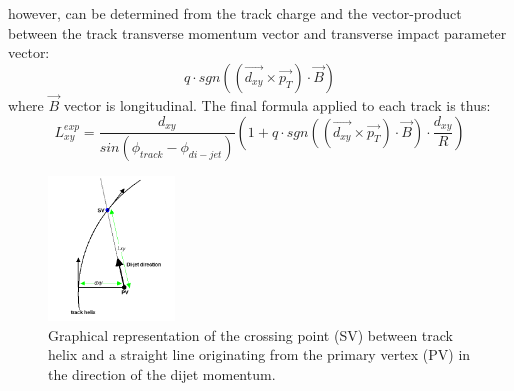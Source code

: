 \begin{enumerate}
however,  can be
determined from the track charge and the vector-product between the track transverse momentum vector and transverse
impact parameter vector:
\begin{equation}
q\cdot sgn((\vec{d_{xy}}\times\vec{p_T}) \cdot \vec{B})
\end{equation}   
where $\vec{B}$ vector is longitudinal. The final formula applied to each track is thus:
\begin{equation}
 L_{xy}^{exp} = \frac{d_{xy}}{sin(\phi_{track} - \phi_{di-jet})} (1 + q\cdot sgn((\vec{d_{xy}}\times\vec{p_T}) \cdot \vec{B}) \cdot \frac{d_{xy}}{R})
\label{eqn:lxy}
\end{equation}


\begin{figure}
\centering
\includegraphics[width=0.3\textwidth]{plots/guessLxy.png}
\caption{Graphical representation of the crossing point (SV) between track helix and a straight line originating from the primary vertex (PV) in the direction of the dijet momentum. \label{fig:guesslxydiagram}}
\end{figure} 


\end{enumerate}
